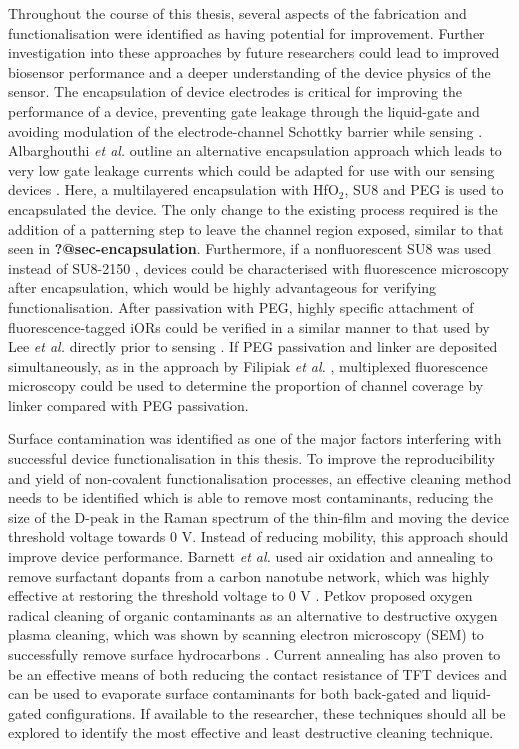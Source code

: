 \documentclass[
  a4paper,
]{scrbook}
\begin{document}
Throughout the course of this thesis, several aspects of the fabrication
and functionalisation were identified as having potential for
improvement. Further investigation into these approaches by future
researchers could lead to improved biosensor performance and a deeper
understanding of the device physics of the sensor. The encapsulation of
device electrodes is critical for improving the performance of a device,
preventing gate leakage through the liquid-gate and avoiding modulation
of the electrode-channel Schottky barrier while sensing
\autocite{Lim2014,Albarghouthi2022,Heller2008}. Albarghouthi \emph{et
al.} outline an alternative encapsulation approach which leads to very
low gate leakage currents which could be adapted for use with our
sensing devices \autocite{Albarghouthi2022}. Here, a multilayered
encapsulation with HfO\(_2\), SU8 and PEG is used to encapsulated the
device. The only change to the existing process required is the addition
of a patterning step to leave the channel region exposed, similar to
that seen in \textbf{?@sec-encapsulation}. Furthermore, if a
nonfluorescent SU8 was used instead of SU8-2150 \autocite{Vobornik2023},
devices could be characterised with fluorescence microscopy after
encapsulation, which would be highly advantageous for verifying
functionalisation. After passivation with PEG, highly specific
attachment of fluorescence-tagged iORs could be verified in a similar
manner to that used by Lee \emph{et al.} directly prior to sensing
\autocite{Lee2012b}. If PEG passivation and linker are deposited
simultaneously, as in the approach by Filipiak \emph{et al.}
\autocite{Filipiak2018}, multiplexed fluorescence microscopy could be
used to determine the proportion of channel coverage by linker compared
with PEG passivation.

Surface contamination was identified as one of the major factors
interfering with successful device functionalisation in this thesis. To
improve the reproducibility and yield of non-covalent functionalisation
processes, an effective cleaning method needs to be identified which is
able to remove most contaminants, reducing the size of the D-peak in the
Raman spectrum of the thin-film and moving the device threshold voltage
towards 0 V. Instead of reducing mobility, this approach should improve
device performance. Barnett \emph{et al.} used air oxidation and
annealing to remove surfactant dopants from a carbon nanotube network,
which was highly effective at restoring the threshold voltage to 0 V
\autocite{Barnett2018}. Petkov proposed oxygen radical cleaning of
organic contaminants as an alternative to destructive oxygen plasma
cleaning, which was shown by scanning electron microscopy (SEM) to
successfully remove surface hydrocarbons \autocite{Petkov2005}. Current
annealing has also proven to be an effective means of both reducing the
contact resistance of TFT devices \autocite{Schnitzspan2020} and can be
used to evaporate surface contaminants for both back-gated
\autocite{Ramamoorthy2018} and liquid-gated \autocite{Kireev2017}
configurations. If available to the researcher, these techniques should
all be explored to identify the most effective and least destructive
cleaning technique.
\end{document}
